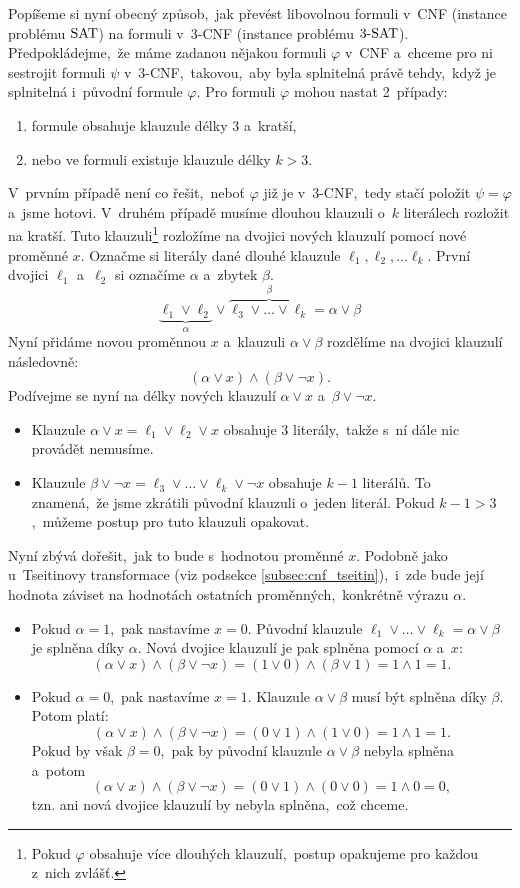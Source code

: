 Popíšeme si nyní obecný způsob,~jak převést libovolnou formuli v~CNF (instance problému \ensuremath{\SAT}) na formuli v~3-CNF (instance problému \ensuremath{\THREESAT}). Předpokládejme,~že máme zadanou nějakou formuli $\varphi$ v~CNF a~chceme pro ni sestrojit formuli $\psi$ v~3-CNF,~takovou,~aby byla splnitelná právě tehdy,~když je splnitelná i~původní formule $\varphi$. Pro formuli $\varphi$ mohou nastat 2~případy:
\begin{enumerate}
    \item formule obsahuje klauzule délky $3$ a~kratší,
    \item nebo ve formuli existuje klauzule délky $k>3$.
\end{enumerate}
V~prvním případě není co řešit,~neboť $\varphi$ již je v~3-CNF,~tedy stačí položit $\psi=\varphi$ a~jsme hotovi. V~druhém případě musíme dlouhou klauzuli o~$k$ literálech rozložit na kratší. Tuto klauzuli\footnote{Pokud $\varphi$ obsahuje více dlouhých klauzulí,~postup opakujeme pro každou z~nich zvlášť.} rozložíme na dvojici nových klauzulí pomocí nové proměnné $x$. Označme si literály dané dlouhé klauzule $\ell_1,\ell_2,\dots\ell_k$. První dvojici $\ell_1$ a~$\ell_2$ si označíme $\alpha$ a~zbytek $\beta$.
\[\underbrace{\ell_1\lor\ell_2}_{\alpha}\lor\overbrace{\ell_3\lor\dots\lor\ell_k}^{\beta}=\alpha\lor\beta\]
Nyní přidáme novou proměnnou $x$ a~klauzuli $\alpha\lor\beta$ rozdělíme na dvojici klauzulí následovně:
\[(\alpha\lor x)\land(\beta\lor\neg x).\]
Podívejme se nyní na délky nových klauzulí $\alpha\lor x$ a~$\beta\lor\neg x$.
\begin{itemize}
    \item Klauzule $\alpha\lor x=\ell_1\lor\ell_2\lor x$ obsahuje $3$ literály,~takže s~ní dále nic provádět nemusíme.
    \item Klauzule $\beta\lor\neg x=\ell_3\lor\dots\lor\ell_k\lor\neg x$ obsahuje $k-1$ literálů. To znamená,~že jsme zkrátili původní klauzuli o~jeden literál. Pokud $k-1>3$,~můžeme postup pro tuto klauzuli opakovat.
\end{itemize}
Nyní zbývá dořešit,~jak to bude s~hodnotou proměnné $x$. Podobně jako u~Tseitinovy transformace (viz podsekce \ref{subsec:cnf_tseitin}),~i~zde bude její hodnota záviset na hodnotách ostatních proměnných,~konkrétně výrazu $\alpha$.
\begin{itemize}
    \item Pokud $\alpha=1$,~pak nastavíme $x=0$. Původní klauzule $\ell_1\lor\dots\lor\ell_k=\alpha\lor\beta$ je splněna díky $\alpha$. Nová dvojice klauzulí je pak splněna pomocí $\alpha$ a~$x$:
    \[(\alpha\lor x)\land(\beta\lor\neg x)=(1\lor 0)\land(\beta\lor 1)=1\land 1=1.\]
    \item Pokud $\alpha=0$,~pak nastavíme $x=1$. Klauzule $\alpha\lor\beta$ musí být splněna díky $\beta$. Potom platí:
    \[(\alpha\lor x)\land(\beta\lor\neg x)=(0\lor 1)\land(1\lor 0)=1\land 1=1.\]
    Pokud by však $\beta=0$,~pak by původní klauzule $\alpha\lor\beta$ nebyla splněna a~potom
    \[(\alpha\lor x)\land(\beta\lor\neg x)=(0\lor 1)\land(0\lor 0)=1\land 0=0,\]
    tzn. ani nová dvojice klauzulí by nebyla splněna,~což chceme.
\end{itemize}
